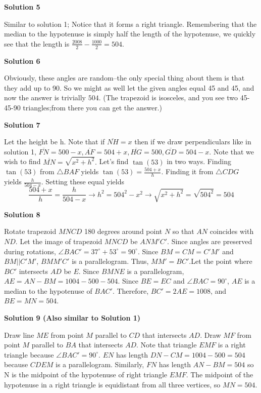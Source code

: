 \begin{enumerate}
 


 



\textbf{Solution 5}

Similar to solution 1; Notice that it forms a right triangle. Remembering that the median to the hypotenuse is simply half the length of the hypotenuse, we quickly see that the length is $\frac{2008}{2}-\frac{1000}{2}=504$.

 



\textbf{Solution 6}

Obviously, these angles are random--the only special thing about them is that they add up to 90. So we might as well let the given angles equal 45 and 45, and now the answer is trivially $\boxed{504}$. (The trapezoid is isosceles, and you see two 45-45-90 triangles;from there you can get the answer.)

 



\textbf{Solution 7}

Let the height be h. Note that if $\overline{NH} = x$ then if we draw perpendiculars like in solution 1, $\overline{FN} = 500 - x, \overline{AF} = 504 + x, \overline{HG} = 500, \overline{GD} = 504 - x.$ Note that we wish to find $\overline{MN} = \sqrt{x^2 + h^2}.$ Let's find $\tan(53)$ in two ways. Finding $\tan(53)$ from $\triangle BAF$ yields $\tan(53) = \frac{504+x}{h}.$ Finding it from $\triangle CDG$ yields $\frac{h}{504-x}.$ Setting these equal yields 
 \[\frac{504+x}{h}=\frac{h}{504-x} \rightarrow h^2 = 504^2-x^2 \rightarrow \sqrt{x^2+h^2} = \sqrt{504^2} = \boxed{504}\]




\textbf{Solution 8}

Rotate trapezoid $MNCD$ 180 degrees around point $N$ so that $AN$ coincides with $ND$. Let the image of trapezoid $MNCD$ be $ANM'C'$. Since angles are preserved during rotations, $\angle BAC' = 37^{\circ} + 53 ^{\circ} =90 ^{\circ}$. Since $BM=CM=C'M'$ and $BM || C'M'$, $BMM'C'$ is a parallelogram. Thus, $MM'=BC'$.Let the point where $BC'$ intersects $AD$ be $E$. Since $BMNE$ is a parallelogram, $AE=AN-BM=1004-500-504$. Since $BE=EC$ and $\angle BAC= 90^{\circ}$, $AE$ is a median to the hypotenuse of $BAC'$. Therefore, $BC'=2 AE= 1008$, and $BE=MN=\boxed{504}.$




\textbf{Solution 9 (Also similar to Solution 1)}

Draw line $ME$ from point $M$ parallel to $CD$ that intersects $AD$. Draw $MF$ from point $M$ parallel to $BA$ that intersects $AD$. Note that triangle $EMF$ is a right triangle because $\angle BAC' = 90^{\circ}$. $EN$ has length $DN - CM = 1004 - 500 = 504$ because $CDEM$ is a parallelogram. Similarly, $FN$ has length $AN - BM = 504$ so N is the midpoint of the hypotenuse of right triangle $EMF$. The midpoint of the hypotenuse in a right triangle is equidistant from all three vertices, so $MN = \boxed{504}$.


\end{enumerate}
